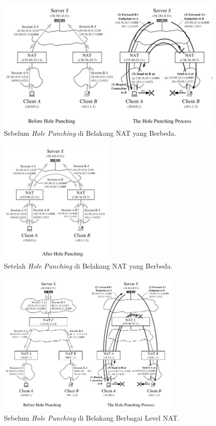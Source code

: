 \begin{figure}[H]
  \centering{}
  \includegraphics[width=1\textwidth]{gambar/hole_punching_behind_different_nat_1}
  \caption{Sebelum \emph{Hole Punching} di Belakang NAT yang Berbeda.}
\end{figure}

\begin{figure}[H]
  \centering{}
  \includegraphics[width=0.5\textwidth]{gambar/hole_punching_behind_different_nat_2}
  \caption{Setelah \emph{Hole Punching} di Belakang NAT yang Berbeda.}
\end{figure}

\begin{figure}[H]
  \centering{}
  \includegraphics[width=0.8\textwidth]{gambar/hole_punching_behind_different_level_nat_1}
  \caption{Sebelum \emph{Hole Punching} di Belakang Berbagai Level NAT.}
\end{figure}

